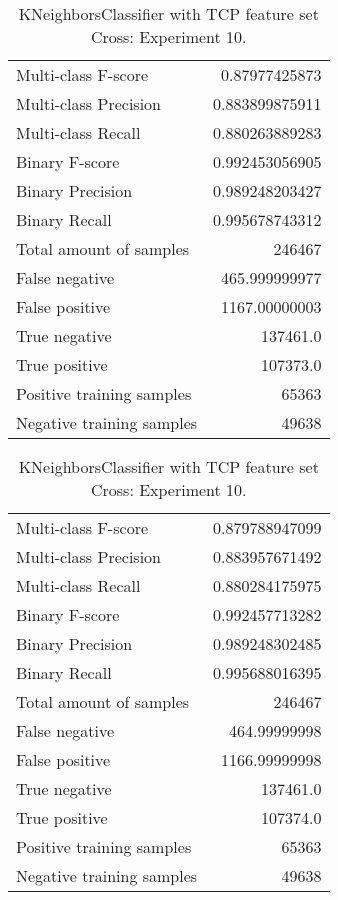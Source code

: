 \begin{table}[H]
\begin{minipage}{0.5\textwidth}
\caption{KNeighborsClassifier with TCP feature set Cross: Experiment 9.}
\centering
\begin{tabular}{l r}
\toprule
Multi-class F-score & 0.87977425873 \\
Multi-class Precision & 0.883899875911 \\
Multi-class Recall & 0.880263889283 \\
\midrule
Binary F-score & 0.992453056905 \\
Binary Precision & 0.989248203427 \\
Binary Recall & 0.995678743312 \\
\midrule
Total amount of samples & 246467 \\
False negative & 465.999999977 \\
False positive & 1167.00000003 \\
True negative & 137461.0 \\
True positive & 107373.0 \\
\midrule
Positive training samples & 65363 \\
Negative training samples & 49638 \\
\bottomrule
\end{tabular}
\end{minipage}
\hfillx
\begin{minipage}{0.5\textwidth}
\caption{KNeighborsClassifier with TCP feature set Cross: Experiment 10.}
\centering
\begin{tabular}{l r}
\toprule
Multi-class F-score & 0.879788947099 \\
Multi-class Precision & 0.883957671492 \\
Multi-class Recall & 0.880284175975 \\
\midrule
Binary F-score & 0.992457713282 \\
Binary Precision & 0.989248302485 \\
Binary Recall & 0.995688016395 \\
\midrule
Total amount of samples & 246467 \\
False negative & 464.99999998 \\
False positive & 1166.99999998 \\
True negative & 137461.0 \\
True positive & 107374.0 \\
\midrule
Positive training samples & 65363 \\
Negative training samples & 49638 \\
\bottomrule
\end{tabular}
\end{minipage}
\end{table}

